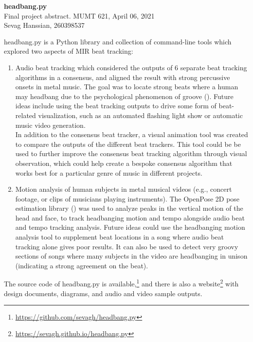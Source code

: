 \documentclass[letter,12pt]{report}
\begin{document}
\noindent\Large{\textbf{headbang.py}}\\
\large{Final project abstract. MUMT 621, April 06, 2021}\\
\large{Sevag Hanssian, 260398537}

\noindent\hrulefill

\vspace{2em}

headbang.py is a Python library and collection of command-line tools which explored two aspects of MIR beat tracking:

\begin{enumerate}
	\item
		Audio beat tracking which considered the outputs of 6 separate beat tracking algorithms in a consensus, and aligned the result with strong percussive onsets in metal music. The goal was to locate strong beats where a human may headbang due to the psychological phenomenon of groove (\cite{groove}). Future ideas include using the beat tracking outputs to drive some form of beat-related visualization, such as an automated flashing light show or automatic music video generation.\\

		\vspace{-0.75em}
		In addition to the consensus beat tracker, a visual animation tool was created to compare the outputs of the different beat trackers. This tool could be be used to further improve the consensus beat tracking algorithm through visual observation, which could help create a bespoke consensus algorithm that works best for a particular genre of music in different projects.
	\item
		Motion analysis of human subjects in metal musical videos (e.g., concert footage, or clips of musicians playing instruments). The OpenPose 2D pose estimation library (\cite{openpose}) was used to analyze peaks in the vertical motion of the head and face, to track headbanging motion and tempo alongside audio beat and tempo tracking analysis. Future ideas could use the headbanging motion analysis tool to supplement beat locations in a song where audio beat tracking alone gives poor results. It can also be used to detect very groovy sections of songs where many subjects in the video are headbanging in unison (indicating a strong agreement on the beat).
\end{enumerate}

The source code of headbang.py is available,\footnote{\url{https://github.com/sevagh/headbang.py}} and there is also a website\footnote{\url{https://sevagh.github.io/headbang.py}} with design documents, diagrams, and audio and video sample outputs.

\vfill
\clearpage

\nocite{*}
\printbibheading[title={\vspace{-3.5em}References},heading=bibnumbered]
\vspace{-1.5em}
\printbibliography[heading=none]
\end{document}
